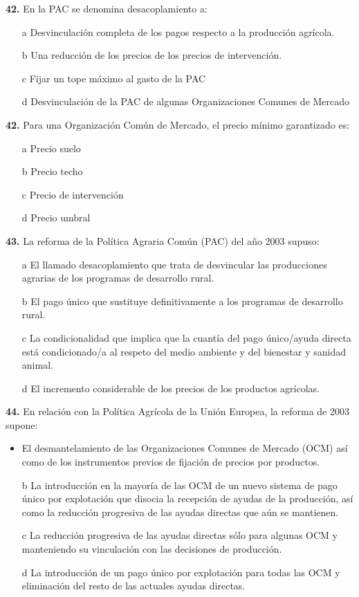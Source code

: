 \documentclass{nuevotema}
\begin{document}
\textbf{42.} En la PAC se denomina desacoplamiento a:
\begin{itemize}
    \item[a] Desvinculación completa de los pagos respecto a la producción agrícola.
    \item[b] Una reducción de los precios de los precios de intervención.
    \item[c] Fijar un tope máximo al gasto de la PAC
    \item[d] Desvinculación de la PAC de algunas Organizaciones Comunes de Mercado
\end{itemize}

\textbf{42.} Para una Organización Común de Mercado, el precio mínimo garantizado es:
\begin{itemize}
    \item[a] Precio suelo
    \item[b] Precio techo
    \item[c] Precio de intervención
    \item[d] Precio umbral
\end{itemize}

\textbf{43.} La reforma de la Política Agraria Común (PAC) del año 2003 supuso:
\begin{itemize}
    \item[a] El llamado desacoplamiento que trata de desvincular las producciones agrarias de los programas de desarrollo rural.
    \item[b] El pago único que sustituye definitivamente a los programas de desarrollo rural.
    \item[c] La condicionalidad que implica que la cuantía del pago único/ayuda directa está condicionado/a al respeto del medio ambiente y del bienestar y sanidad animal.
    \item[d] El incremento considerable de los precios de los productos agrícolas.
\end{itemize}

\textbf{44.} En relación con la Política Agrícola de la Unión Europea, la reforma de 2003 supone:
\begin{itemize}
    \item El desmantelamiento de las Organizaciones Comunes de Mercado (OCM) así como de los instrumentos previos de fijación de precios por productos.
    \item[b] La introducción en la mayoría de las OCM de un nuevo sistema de pago único por explotación que disocia la recepción de ayudas de la producción, así como la reducción progresiva de las ayudas directas que aún se mantienen.
    \item[c] La reducción progresiva de las ayudas directas sólo para algunas OCM y manteniendo su vinculación con las decisiones de producción.
    \item[d] La introducción de un pago único por explotación para todas las OCM y eliminación del resto de las actuales ayudas directas.
\end{itemize}
\end{document}

